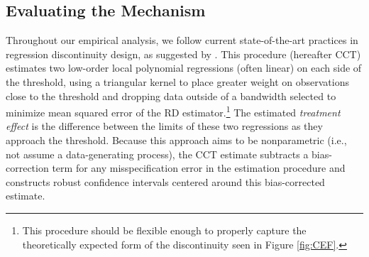 \documentclass[12pt]{article}
\begin{document}
\subsection{Evaluating the Mechanism}

Throughout our empirical analysis, we follow current state-of-the-art practices in regression discontinuity design, as suggested by \citet{Calonico2014}. This procedure (hereafter CCT) estimates two low-order local polynomial regressions (often linear) on each side of the threshold, using a triangular kernel to place greater weight on observations close to the threshold and dropping data outside of a bandwidth selected to minimize mean squared error of the RD estimator.\footnote{This procedure should be flexible enough to properly capture the theoretically expected form of the discontinuity seen in Figure \ref{fig:CEF}.} The estimated \textit{treatment effect} is the difference between the limits of these two regressions as they approach the threshold. Because this approach aims to be nonparametric (i.e., not assume a data-generating process), the CCT estimate subtracts a bias-correction term for any misspecification error in the estimation procedure and constructs robust confidence intervals centered around this bias-corrected estimate. 
\end{document}
